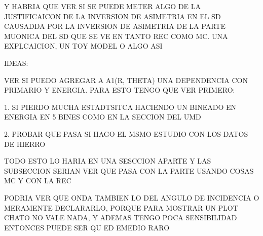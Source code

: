 Y HABRIA QUE VER SI SE PUEDE METER ALGO DE LA JUSTIFICAICON DE LA INVERSION DE ASIMETRIA EN EL SD CAUSADDA POR LA INVERSION DE ASIMETRIA DE LA PARTE MUONICA DEL SD QUE SE VE EN TANTO REC COMO MC. UNA EXPLCAICION, UN TOY MODEL O ALGO ASI



 IDEAS:
 
 VER SI PUEDO AGREGAR A A1(R, THETA) UNA DEPENDENCIA CON PRIMARIO Y ENERGIA. PARA ESTO TENGO QUE VER PRIMERO:
 
 1. SI PIERDO MUCHA ESTADTSITCA HACIENDO UN BINEADO EN ENERGIA EN 5 BINES COMO EN LA SECCION DEL UMD
 
 2. PROBAR QUE PASA SI HAGO EL MSMO ESTUDIO CON LOS DATOS DE HIERRO
 
 TODO ESTO LO HARIA EN UNA SESCCION APARTE Y LAS SUBSECCION SERIAN VER QUE PASA CON LA PARTE USANDO COSAS MC Y CON LA REC
 
 
 
 PODRIA VER QUE ONDA TAMBIEN LO DEL ANGULO DE INCIDENCIA O MERAMENTE DECLARARLO, PORQUE PARA MOSTRAR UN PLOT CHATO NO VALE NADA, Y ADEMAS TENGO POCA SENSIBILIDAD ENTONCES PUEDE SER QU ED EMEDIO RARO
 

\newpage